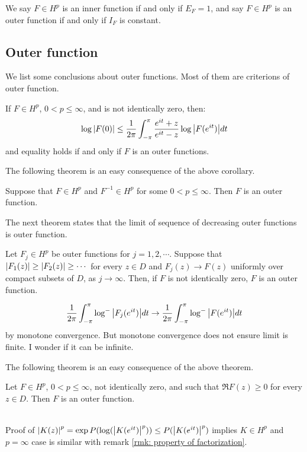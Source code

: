 We say $F\in H^p$ is an inner function if and only if $E_F=1$, and say $F\in H^p$ is an outer function if and only if $I_F$ is constant.
\subsection{Outer function}
We list some conclusions about outer functions. Most of them are criterions of outer function.
\begin{corollary}
    If $F\in H^p$, $0<p\leq\infty$, and is not identically zero, then:
    \begin{equation*}
        \log\left\lvert F(0)\right\rvert\leq \frac{1}{2\pi}\int_{-\pi}^{\pi}{\frac{e^{it}+z}{e^{it}-z}\log{\left\lvert F(e^{it})\right\rvert}d t}
    \end{equation*}
    and equality holds if and only if $F$ is an outer functions.
\end{corollary}
The following theorem is an easy consequence of the above corollary.
\begin{theorem}
    Suppose that $F\in H^p$ and $F^{-1}\in H^p$ for some $0<p\leq\infty$. Then $F$ is an outer function.
\end{theorem}
The next theorem states that the limit of sequence of decreasing outer functions is outer function.
\begin{theorem}
    Let $F_j\in H^p$ be outer functions for $j=1,2,\cdots$. Suppose that $\left\lvert F_1(z)\right\rvert\geq\left\lvert F_2(z)\right\rvert\geq\cdots$ for every
    $z\in D$ and $F_j(z)\to F(z)$ uniformly over compact subsets of $D$, as $j\to\infty$. Then, if $F$ is not identically zero, $F$ is an outer function.
\end{theorem}
\begin{remark}
    \begin{equation*}
        \frac{1}{2\pi}\int_{-\pi}^{\pi}{\log^-{\left\lvert F_j(e^{it})\right\rvert}d t}\to \frac{1}{2\pi}\int_{-\pi}^{\pi}{\log^-{\left\lvert F(e^{it})\right\rvert}d t}
    \end{equation*}
    by monotone convergence. {\color{blue}But monotone convergence does not ensure limit is finite. I wonder if it can be infinite}.
\end{remark}
The following theorem is an easy consequence of the above theorem.
\begin{theorem}
    Let $F\in H^p$, $0<p\leq\infty$, not identically zero, and such that $\Re{F(z)}\geq 0$ for every $z\in D$. Then $F$ is an outer function.
\end{theorem}
\begin{remark}\ \\
    Proof of $\left\lvert K(z)\right\rvert^p=\exp{P(\log(\left\lvert K(e^{it})\right\rvert^p))}\leq P(\left\lvert K(e^{it})\right\rvert^p)$ implies $K\in H^p$ and $p=\infty$ case is similar with remark \ref{rmk: property of factorization}.
\end{remark}
